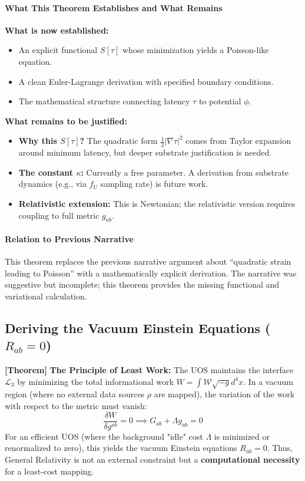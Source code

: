 \documentclass[11pt,titlepage]{article}
\newcommand{\interface}{\mathcal{L}_3}
\newcommand{\tagtheo}{\textcolor{green!60!black}{\textbf{[Theorem]}} }
\begin{document}
\paragraph{What This Theorem Establishes and What Remains}
\begin{tcolorbox}[colback=green!5!white,colframe=green!75!black,title=Status: Complete Toy Model Derivation]
\textbf{What is now established:}
\begin{itemize}
    \item An explicit functional $S[\tau]$ whose minimization yields a Poisson-like equation.
    \item A clean Euler-Lagrange derivation with specified boundary conditions.
    \item The mathematical structure connecting latency $\tau$ to potential $\phi$.
\end{itemize}

\textbf{What remains to be justified:}
\begin{itemize}
    \item \textbf{Why this $S[\tau]$?} The quadratic form $\frac{1}{2}|\nabla\tau|^2$ comes from Taylor expansion around minimum latency, but deeper substrate justification is needed.
    \item \textbf{The constant $\kappa$:} Currently a free parameter. A derivation from substrate dynamics (e.g., via $f_U$ sampling rate) is future work.
    \item \textbf{Relativistic extension:} This is Newtonian; the relativistic version requires coupling to full metric $g_{ab}$.
\end{itemize}
\end{tcolorbox}

\paragraph{Relation to Previous Narrative}
This theorem replaces the previous narrative argument about ``quadratic strain leading to Poisson'' with a mathematically explicit derivation. The narrative was suggestive but incomplete; this theorem provides the missing functional and variational calculation.
\subsection{Deriving the Vacuum Einstein Equations (\texorpdfstring{$R_{ab}=0$}{Rab=0})}
\tagtheo \textbf{The Principle of Least Work:} The UOS maintains the interface $\interface$ by minimizing the total informational work $W = \int \mathcal{W} \sqrt{-g} d^4x$. In a vacuum region (where no external data sources $\rho$ are mapped), the variation of the work with respect to the metric must vanish:
\begin{equation}
\frac{\delta W}{\delta g^{ab}} = 0 \implies G_{ab} + \Lambda g_{ab} = 0
\end{equation}
For an efficient UOS (where the background "idle" cost $\Lambda$ is minimized or renormalized to zero), this yields the vacuum Einstein equations $R_{ab} = 0$. Thus, General Relativity is not an external constraint but a \textbf{computational necessity} for a least-cost mapping.
\end{document}
